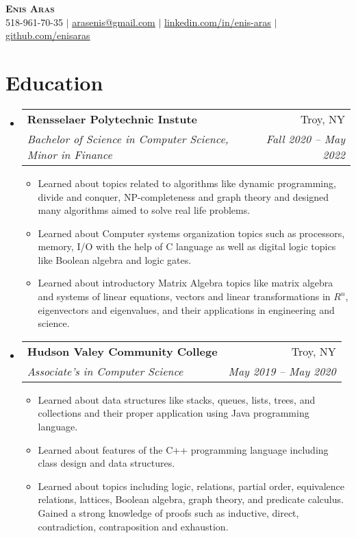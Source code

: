 \documentclass[letterpaper,11pt]{article}
\makeatletter
\newcommand{\resumeItem}[1]{
  \item\small{
    {#1 \vspace{-2pt}}
  }
}
\newcommand{\resumeSubheading}[4]{
  \vspace{-2pt}\item
    \begin{tabular*}{0.97\textwidth}[t]{l@{\extracolsep{\fill}}r}
      \textbf{#1} & #2 \\
      \textit{\small#3} & \textit{\small #4} \\
    \end{tabular*}\vspace{-7pt}
}
\newcommand{\resumeSubHeadingListStart}{\begin{itemize}[leftmargin=0.15in, label={}]}
\newcommand{\resumeSubHeadingListEnd}{\end{itemize}}
\newcommand{\resumeItemListStart}{\begin{itemize}}
\newcommand{\resumeItemListEnd}{\end{itemize}\vspace{-5pt}}
\makeatother
\begin{document}

\begin{center}
    \textbf{\Huge \scshape Enis Aras} \\ \vspace{1pt}
    \small 518-961-70-35 $|$ \href{mailto: arasenis@gmail.com}{\underline{arasenis@gmail.com}} $|$ 
    \href{https://linkedin.com/in/enis-aras}{\underline{linkedin.com/in/enis-aras}} $|$
    \href{https://github.com/enisaras}{\underline{github.com/enisaras}}
\end{center}


\section{Education}
  \resumeSubHeadingListStart
    \resumeSubheading
      {Rensselaer Polytechnic Instute}{Troy, NY}
      {Bachelor of Science in Computer Science, Minor in Finance}{Fall 2020 -- May 2022}
      \resumeItemListStart
       \resumeItem{Learned about topics related to algorithms like dynamic programming, divide and conquer, NP-completeness and graph theory and designed many algorithms aimed to solve real life problems.}
       \resumeItem{Learned about Computer systems organization topics such as processors, memory, I/O with the help of C language as well as digital logic topics like Boolean algebra and logic gates.}
       \resumeItem{Learned about introductory Matrix Algebra topics like matrix algebra and systems of linear equations, vectors and linear transformations in $R^n$, eigenvectors and eigenvalues, and their applications in engineering and science.}
       \resumeItemListEnd
    \resumeSubheading
      {Hudson Valey Community College}{Troy, NY}
      {Associate's in Computer Science}{May 2019 -- May 2020}
        \resumeItemListStart
        \resumeItem{Learned about data structures like stacks, queues, lists, trees, and collections and their proper application using Java programming language.}
        \resumeItem{Learned about features of the C++ programming language including class design and data structures.}
       \resumeItem{Learned about topics including logic, relations, partial order, equivalence relations, lattices, Boolean algebra, graph theory, and predicate calculus. Gained a strong knowledge of proofs such as inductive, direct, contradiction, contraposition and exhaustion.}
       \resumeItemListEnd
  \resumeSubHeadingListEnd
\end{document}
